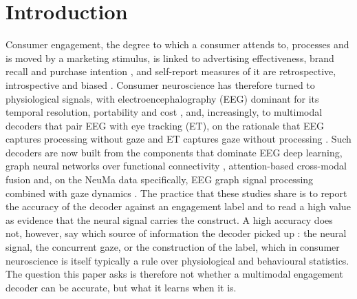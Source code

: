 \maketitle

\section{Introduction}\label{sec:intro}

Consumer engagement, the degree to which a consumer attends to, processes and is moved by a marketing stimulus, is linked to advertising effectiveness, brand recall and purchase intention \cite{ref1,ref2}, and self-report measures of it are retrospective, introspective and biased \cite{ref2,ref3}. Consumer neuroscience has therefore turned to physiological signals, with electroencephalography (EEG) dominant for its temporal resolution, portability and cost \cite{ref1,ref6,ref7}, and, increasingly, to multimodal decoders that pair EEG with eye tracking (ET), on the rationale that EEG captures processing without gaze and ET captures gaze without processing \cite{ref8,ref11}. Such decoders are now built from the components that dominate EEG deep learning, graph neural networks over functional connectivity \cite{ref19,ref20,ref21,ref22}, attention-based cross-modal fusion \cite{ref12,ref24,ref25,ref26,ref27} and, on the NeuMa data specifically, EEG graph signal processing combined with gaze dynamics \cite{ref18}. The practice that these studies share is to report the accuracy of the decoder against an engagement label and to read a high value as evidence that the neural signal carries the construct. A high accuracy does not, however, say which source of information the decoder picked up \cite{ref64}: the neural signal, the concurrent gaze, or the construction of the label, which in consumer neuroscience is itself typically a rule over physiological and behavioural statistics. The question this paper asks is therefore not whether a multimodal engagement decoder can be accurate, but what it learns when it is.

